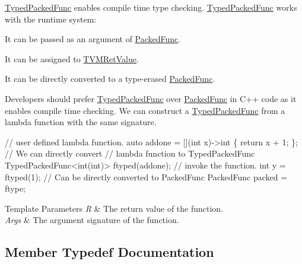 \label{classtvm_1_1runtime_1_1TypedPackedFunc_3_01R_07Args_8_8_8_08_4_TypedPackedFuncAnchor}%
\hypertarget{classtvm_1_1runtime_1_1TypedPackedFunc_3_01R_07Args_8_8_8_08_4_TypedPackedFuncAnchor}{}%
\hyperlink{classtvm_1_1runtime_1_1TypedPackedFunc}{Typed\+Packed\+Func} enables compile time type checking. \hyperlink{classtvm_1_1runtime_1_1TypedPackedFunc}{Typed\+Packed\+Func} works with the runtime system\+:
\begin{DoxyItemize}
\item It can be passed as an argument of \hyperlink{classtvm_1_1runtime_1_1PackedFunc}{Packed\+Func}.
\item It can be assigned to \hyperlink{classtvm_1_1runtime_1_1TVMRetValue}{T\+V\+M\+Ret\+Value}.
\item It can be directly converted to a type-\/erased \hyperlink{classtvm_1_1runtime_1_1PackedFunc}{Packed\+Func}.
\end{DoxyItemize}

Developers should prefer \hyperlink{classtvm_1_1runtime_1_1TypedPackedFunc}{Typed\+Packed\+Func} over \hyperlink{classtvm_1_1runtime_1_1PackedFunc}{Packed\+Func} in C++ code as it enables compile time checking. We can construct a \hyperlink{classtvm_1_1runtime_1_1TypedPackedFunc}{Typed\+Packed\+Func} from a lambda function with the same signature.


\begin{DoxyCode}
\textcolor{comment}{// user defined lambda function.}
\textcolor{keyword}{auto} addone = [](\textcolor{keywordtype}{int} x)->\textcolor{keywordtype}{int} \{
  \textcolor{keywordflow}{return} x + 1;
\};
\textcolor{comment}{// We can directly convert}
\textcolor{comment}{// lambda function to TypedPackedFunc}
TypedPackedFunc<int(int)> ftyped(addone);
\textcolor{comment}{// invoke the function.}
\textcolor{keywordtype}{int} y = ftyped(1);
\textcolor{comment}{// Can be directly converted to PackedFunc}
PackedFunc packed = ftype;
\end{DoxyCode}
 
\begin{DoxyTemplParams}{Template Parameters}
{\em R} & The return value of the function. \\
\hline
{\em Args} & The argument signature of the function. \\
\hline
\end{DoxyTemplParams}


\subsection{Member Typedef Documentation}
